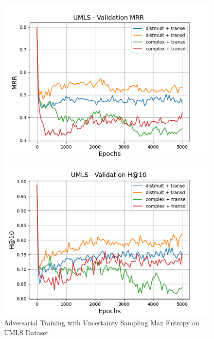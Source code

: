 \begin{figure}
    \begin{minipage}{.5\textwidth}
      \centering
      \includegraphics[width=0.9\linewidth]{figures/results/gan_train/pretrained/uncertainty/max/entropy/umls/gan_train_uncertainty_umls_mrrs.png}
    \end{minipage}%
    \begin{minipage}{.5\textwidth}
      \centering
      \includegraphics[width=0.9\linewidth]{figures/results/gan_train/pretrained/uncertainty/max/entropy/umls/gan_train_uncertainty_umls_hit10s.png}
    \end{minipage}%
    \caption{Adversarial Training with Uncertainty Sampling Max Entropy on \textsc{UMLS} Dataset}
    \label{fig:test}
\end{figure}
